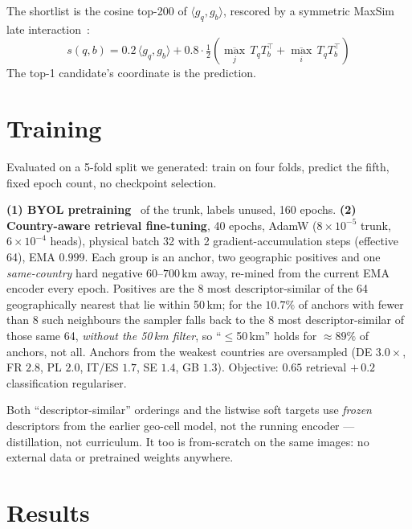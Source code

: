 \documentclass[10pt,a4paper,twocolumn]{article}
\begin{document}
The shortlist is the cosine top-200 of $\langle g_q,g_b\rangle$, rescored by a
symmetric MaxSim late interaction~\cite{colbert}:
\[
s(q,b)=0.2\,\langle g_q,g_b\rangle+0.8\cdot\tfrac12\!\left(
\overline{\max_j}\,T_qT_b^{\!\top}+\overline{\max_i}\,T_qT_b^{\!\top}\right)
\]
The top-1 candidate's coordinate is the prediction.

\section{Training}\label{sec:train}

Evaluated on a 5-fold split we generated: train on four folds, predict the fifth,
fixed epoch count, no checkpoint selection.

\textbf{(1) BYOL pretraining}~\cite{byol} of the trunk, labels unused, 160
epochs. \textbf{(2) Country-aware retrieval fine-tuning}, 40 epochs, AdamW
($8{\times}10^{-5}$ trunk, $6{\times}10^{-4}$ heads), physical batch 32 with 2
gradient-accumulation steps (effective 64), EMA $0.999$. Each group is an
anchor, two geographic positives and one \emph{same-country} hard negative
$60$--$700$\,km away, re-mined from the current EMA encoder every epoch.
Positives are the 8 most descriptor-similar of the 64 geographically nearest
that lie within 50\,km; for the $10.7\%$ of anchors with fewer than 8 such
neighbours the sampler falls back to the 8 most descriptor-similar of those
same 64, \emph{without the 50\,km filter}, so ``$\le$50\,km'' holds for
$\approx89\%$ of anchors, not all.
Anchors from the weakest countries are oversampled (DE $3.0\times$, FR $2.8$,
PL $2.0$, IT/ES $1.7$, SE $1.4$, GB $1.3$). Objective: $0.65$ retrieval $+\,0.2$
classification regulariser.

Both ``descriptor-similar'' orderings and the listwise soft targets use
\emph{frozen} descriptors from the earlier geo-cell model, not the running
encoder --- distillation, not curriculum. It too is from-scratch on the same
images: no external data or pretrained weights anywhere.

\section{Results}
\end{document}
